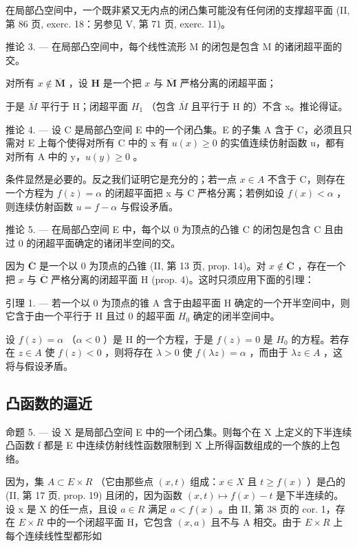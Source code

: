 在局部凸空间中，一个既非紧又无内点的闭凸集可能没有任何闭的支撑超平面 (II, 第 86 页, exerc. 18：另参见 V, 第 71 页, exerc. 11)。

推论 3. --- 在局部凸空间中，每个线性流形 M 的闭包是包含 M 的诸闭超平面的交。

对所有 \(x \notin \overline{\mathbf{M}}\) ，设 \(\mathbf{H}\) 是一个把 \(x\) 与 \(\overline{\mathbf{M}}\) 严格分离的闭超平面；

于是 \(\overline{M}\) 平行于 H；闭超平面 \(H_{1}\) （包含 \(\overline{M}\) 且平行于 H 的）不含 x。推论得证。

推论 4. --- 设 C 是局部凸空间 E 中的一个闭凸集。E 的子集 A 含于 C，必须且只需对 E 上每个使得对所有 C 中的 x 有 \(u(x) \geqslant 0\) 的实值连续仿射函数 u，都有对所有 A 中的 y，\(u(y) \geqslant 0\) 。

条件显然是必要的。反之我们证明它是充分的；若一点 \(x \in A\) 不含于 C，则存在一个方程为 \(f(z) = \alpha\) 的闭超平面把 x 与 C 严格分离；若例如设 \(f(x) < \alpha\) ，则连续仿射函数 \(u = f - \alpha\) 与假设矛盾。

推论 5. --- 在局部凸空间 E 中，每个以 0 为顶点的凸锥 C 的闭包是包含 C 且由过 0 的闭超平面确定的诸闭半空间的交。

因为 \(\overline{\mathbf{C}}\) 是一个以 0 为顶点的凸锥 (II, 第 13 页, prop. 14)。对 \(x \notin \overline{\mathbf{C}}\) ，存在一个把 \(x\) 与 \(\overline{\mathbf{C}}\) 严格分离的闭超平面 H (prop. 4)。这时只须应用下面的引理：

引理 1. --- 若一个以 0 为顶点的锥 A 含于由超平面 H 确定的一个开半空间中，则它含于由一个平行于 H 且过 0 的超平面 \(H_{0}\) 确定的闭半空间中。

设 \(f(z) = \alpha\) （\(\alpha < 0\) ）是 H 的一个方程，于是 \(f(z) = 0\) 是 \(H_0\) 的方程。若存在 \(z \in A\) 使 \(f(z) < 0\) ，则将存在 \(\lambda > 0\) 使 \(f(\lambda z) = \alpha\) ，而由于 \(\lambda z \in A\) ，这将与假设矛盾。

\subsection{凸函数的逼近}

命题 5. --- 设 X 是局部凸空间 E 中的一个闭凸集。则每个在 X 上定义的下半连续凸函数 f 都是 E 中连续仿射线性函数限制到 X 上所得函数组成的一个族的上包络。

因为，集 \(A \subset E \times R\) （它由那些点 \((x, t)\) 组成：\(x \in X\) 且 \(t \geqslant f(x)\) ）是凸的 (II, 第 17 页, prop. 19) 且闭的，因为函数 \((x, t) \mapsto f(x) - t\) 是下半连续的。设 x 是 X 的任一点，且设 \(a \in R\) 满足 \(a < f(x)\) 。由 II, 第 38 页的 cor. 1，存在 \(E \times R\) 中的一个闭超平面 H，它包含 \((x, a)\) 且不与 A 相交。由于 \(E \times R\) 上每个连续线性型都形如

